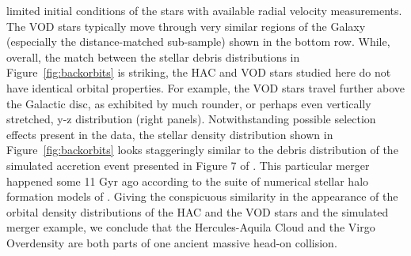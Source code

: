 \documentclass[fleqn,usenatbib]{mnras}
\begin{document}
limited initial conditions of the stars with available radial velocity
measurements. The VOD stars typically move through very similar
regions of the Galaxy (especially the distance-matched sub-sample)
shown in the bottom row. While, overall, the match between the stellar
debris distributions in Figure~\ref{fig:backorbits} is striking, the
HAC and VOD stars studied here do not have identical orbital
properties. For example, the VOD stars travel further above the
Galactic disc, as exhibited by much rounder, or perhaps even
vertically stretched, y-z distribution (right panels).
%
Notwithstanding possible selection effects present in the data, the
stellar density distribution shown in Figure~\ref{fig:backorbits}
looks staggeringly similar to the debris distribution of the simulated
accretion event presented in Figure 7 of \citet{Simion2018}. This
particular merger happened some 11 Gyr ago according to the suite of
numerical stellar halo formation models of \citet{Bu05}. Giving the
conspicuous similarity in the appearance of the orbital density
distributions of the HAC and the VOD stars and the simulated merger
example, we conclude that the Hercules-Aquila Cloud and the Virgo
Overdensity are both parts of one ancient massive head-on collision.
%
%
\end{document}
